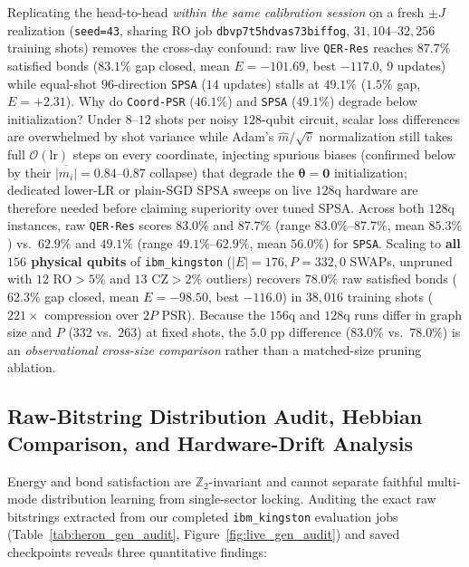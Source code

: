 \documentclass[11pt]{article}
\begin{document}
Replicating the head-to-head \emph{within the same calibration session} on a fresh $\pm J$ realization (\texttt{seed=43}, sharing RO job \texttt{dbvp7t5hdvas73biffog}, $31{,}104$--$32{,}256$ training shots) removes the cross-day confound: raw live \texttt{QER-Res} reaches $87.7\%$ satisfied bonds ($83.1\%$ gap closed, mean $E=-101.69$, best $-117.0$, $9$ updates) while equal-shot $96$-direction \texttt{SPSA} ($14$ updates) stalls at $49.1\%$ ($1.5\%$ gap, $E=+2.31$). Why do \texttt{Coord-PSR} ($46.1\%$) and \texttt{SPSA} ($49.1\%$) degrade below initialization? Under $8$--$12$ shots per noisy $128$-qubit circuit, scalar loss differences are overwhelmed by shot variance while Adam's $\hat{m}/\sqrt{\hat{v}}$ normalization still takes full $\mathcal{O}(\text{lr})$ steps on every coordinate, injecting spurious biases (confirmed below by their $\overline{|m_i|}{=}0.84$--$0.87$ collapse) that degrade the $\boldsymbol{\theta}{=}\mathbf{0}$ initialization; dedicated lower-LR or plain-SGD SPSA sweeps on live $128$q hardware are therefore needed before claiming superiority over tuned SPSA. Across both $128$q instances, raw \texttt{QER-Res} scores $83.0\%$ and $87.7\%$ (range $83.0\%$--$87.7\%$, mean $85.3\%$) vs.\ $62.9\%$ and $49.1\%$ (range $49.1\%$--$62.9\%$, mean $56.0\%$) for \texttt{SPSA}. Scaling to \textbf{all $156$ physical qubits} of \texttt{ibm\_kingston} ($|E|{=}176, P{=}332, 0$ SWAPs, unpruned with $12$ RO$>5\%$ and $13$ CZ$>2\%$ outliers) recovers $78.0\%$ raw satisfied bonds ($62.3\%$ gap closed, mean $E=-98.50$, best $-116.0$) in $38{,}016$ training shots ($221\times$ compression over $2P$ PSR). Because the $156$q and $128$q runs differ in graph size and $P$ ($332$ vs.\ $263$) at fixed shots, the $5.0\text{ pp}$ difference ($83.0\%$ vs.\ $78.0\%$) is an \emph{observational cross-size comparison} rather than a matched-size pruning ablation.

\subsection{Raw-Bitstring Distribution Audit, Hebbian Comparison, and Hardware-Drift Analysis}
\label{sec:heron_audit}
Energy and bond satisfaction are $\mathbb{Z}_2$-invariant and cannot separate faithful multi-mode distribution learning from single-sector locking. Auditing the exact raw bitstrings extracted from our completed \texttt{ibm\_kingston} evaluation jobs (Table~\ref{tab:heron_gen_audit}, Figure~\ref{fig:live_gen_audit}) and saved checkpoints reveals three quantitative findings:
\end{document}
